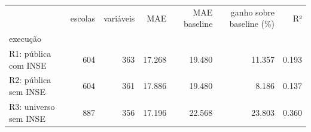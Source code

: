 \begin{tabular}{lrrrrrr}
\toprule
 & escolas & variáveis & MAE & MAE baseline & ganho sobre baseline (\%) & R² \\
execução &  &  &  &  &  &  \\
\midrule
R1: pública com INSE & 604 & 363 & 17.268 & 19.480 & 11.357 & 0.193 \\
R2: pública sem INSE & 604 & 361 & 17.886 & 19.480 & 8.186 & 0.137 \\
R3: universo sem INSE & 887 & 356 & 17.196 & 22.568 & 23.803 & 0.360 \\
\bottomrule
\end{tabular}
